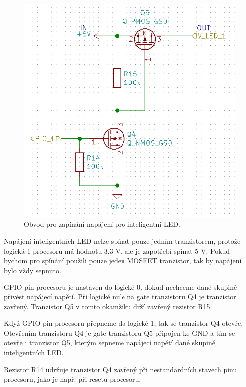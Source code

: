 \begin{figure}[!h]
  \begin{center}
    \includegraphics[scale=0.8]{obrazky/Zapinani_napajeni_LED.png}
  \end{center}
  \caption[Obvod pro zapínání napájení pro inteligentní LED]{Obvod pro zapínání napájení pro inteligentní LED.}
\end{figure}

Napájení inteligentních LED nelze spínat pouze jedním tranzistorem, protože logická 1 procesoru má hodnotu 3,3 V, ale je 
zapotřebí spínat 5 V. Pokud bychom pro spínání použili pouze jeden MOSFET tranzistor, tak by napájení bylo vždy sepnuto.

GPIO pin procesoru je nastaven do logické 0, dokud nechceme dané skupině přivést napájecí napětí. Při logické nule na gate 
tranzistoru Q4 je tranzistor zavřený. Tranzistor Q5 v tomto okamžiku drží zavřený rezistor R15.

Když GPIO pin procesoru přepneme do logické 1, tak se tranzistor Q4 otevře. Otevřením tranzistoru Q4 je gate tranzistoru Q5 
připojen ke GND a tím se otevře i tranzistor Q5, kterým sepneme napájecí napětí dané skupině inteligentních LED.

Rezistor R14 udržuje tranzistor Q4 zavřený při nestandardních stavech pinu procesoru, jako je např. při resetu procesoru.


